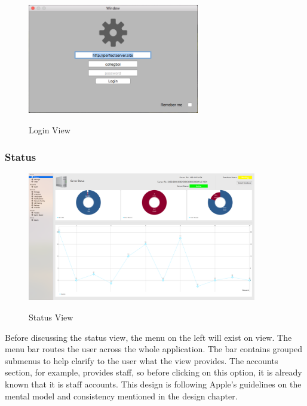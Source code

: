 \begin{figure}[!h]
    \caption{Login View}
    \centering
    \includegraphics[width=75mm]{images/dashboard/login}
    \label{fig:log-in-view}
\end{figure}

\subsubsection{Status}

\begin{figure}[!h]
    \caption{Status View}
    \centering
    \includegraphics[width=100mm]{images/dashboard/status_view}
    \label{fig:status-view}
\end{figure}

Before discussing the status view, the menu on the left will exist on view. The menu bar routes the user across the whole application. The bar contains grouped submenus to help clarify to the user what the view provides. The accounts section, for example, provides staff, so before clicking on this option, it is already known that it is staff accounts. This design is following Apple's guidelines on the mental model and consistency mentioned in the design chapter.

